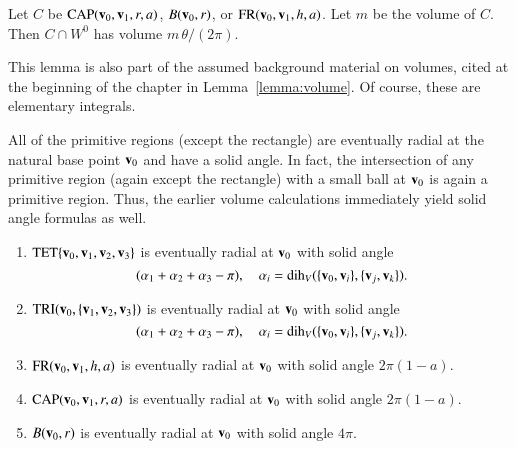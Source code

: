 \begin{lemma}\label{lemma:wedge-vol}  
Let $C$ be ${\operatorname{CAP}}({\mathbf v}_0,{\mathbf v}_1,r,a)$, $B({\mathbf v}_0,r)$,  
or ${\operatorname{FR}}({\mathbf v}_0,{\mathbf v}_1,h,a)$.  Let $m$ be the volume of $C$.  Then
$C\cap W^0$ has volume $m\,\theta/(2\pi)$.
\end{lemma}
%

This lemma is also part of the assumed background material on volumes,
cited at the beginning of the chapter in Lemma~\ref{lemma:volume}.
Of course, these are elementary integrals.







All of the primitive regions (except the rectangle) 
are eventually radial at the natural
base point ${\mathbf v}_0$ and have a
solid angle.  In fact, the intersection of any primitive region (again except
the rectangle) with a small ball at ${\mathbf v}_0$ is again a primitive region.  Thus,
the earlier volume calculations immediately yield solid angle formulas as well.
%

\begin{lemma} \label{lemma:prim-sol}
\begin{enumerate}
\item ${\operatorname{TET}}\{{\mathbf v}_0,{\mathbf v}_1,{\mathbf v}_2,{\mathbf v}_3\}$ is eventually radial at ${\mathbf v}_0$
with solid angle
\[ 
(\alpha_1+\alpha_2+\alpha_3-\pi),\quad
\alpha_i=\operatorname{dih}_V(\{{\mathbf v}_0,{\mathbf v}_i\},\{{\mathbf v}_j,{\mathbf v}_k\}).
\] 
\item  ${\operatorname{TRI}}({\mathbf v}_0,\{{\mathbf v}_1,{\mathbf v}_2,{\mathbf v}_3\})$ is eventually radial at ${\mathbf v}_0$
with solid angle 
\[ 
(\alpha_1+\alpha_2+\alpha_3-\pi),\quad
\alpha_i=\operatorname{dih}_V(\{{\mathbf v}_0,{\mathbf v}_i\},\{{\mathbf v}_j,{\mathbf v}_k\}).
\] 
\item ${\operatorname{FR}}({\mathbf v}_0,{\mathbf v}_1,h,a)$ is eventually radial at ${\mathbf v}_0$ with solid
angle        $2\pi (1-a)$.
\item ${\operatorname{CAP}}({\mathbf v}_0,{\mathbf v}_1,r,a)$ is eventually radial at ${\mathbf v}_0$ with solid
angle 
$2\pi(1-a)$.
\item $B({\mathbf v}_0,r)$ is eventually radial at ${\mathbf v}_0$ with solid
angle 
$4\pi$.
%
\end{enumerate}
\end{lemma}
%
%
%
%

